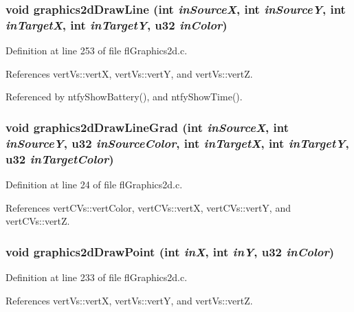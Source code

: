 \subsubsection{\setlength{\rightskip}{0pt plus 5cm}void graphics2d\-Draw\-Line (int {\em in\-Source\-X}, int {\em in\-Source\-Y}, int {\em in\-Target\-X}, int {\em in\-Target\-Y}, u32 {\em in\-Color})}\label{flGraphics2d_8c_91470709f2985e747c865ec42a1c5db6}




Definition at line 253 of file fl\-Graphics2d.c.

References vert\-Vs::vert\-X, vert\-Vs::vert\-Y, and vert\-Vs::vert\-Z.

Referenced by ntfy\-Show\-Battery(), and ntfy\-Show\-Time().
\subsubsection{\setlength{\rightskip}{0pt plus 5cm}void graphics2d\-Draw\-Line\-Grad (int {\em in\-Source\-X}, int {\em in\-Source\-Y}, u32 {\em in\-Source\-Color}, int {\em in\-Target\-X}, int {\em in\-Target\-Y}, u32 {\em in\-Target\-Color})}\label{flGraphics2d_8c_050ddc43fb117ac6974124bfc739f9ab}




Definition at line 24 of file fl\-Graphics2d.c.

References vert\-CVs::vert\-Color, vert\-CVs::vert\-X, vert\-CVs::vert\-Y, and vert\-CVs::vert\-Z.
\subsubsection{\setlength{\rightskip}{0pt plus 5cm}void graphics2d\-Draw\-Point (int {\em in\-X}, int {\em in\-Y}, u32 {\em in\-Color})}\label{flGraphics2d_8c_21062187e2fc088d5baff827b840956e}




Definition at line 233 of file fl\-Graphics2d.c.

References vert\-Vs::vert\-X, vert\-Vs::vert\-Y, and vert\-Vs::vert\-Z.
